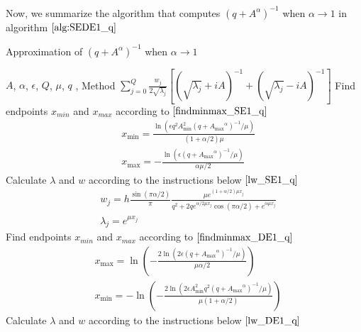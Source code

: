 Now, we summarize the algorithm that computes $(q+A^{\alpha})^{-1}$ when $\alpha \rightarrow 1$ in algorithm $\ref{alg:SEDE1_q}$
\begin{breakablealgorithm}
	\caption{Approximation of $(q+A^{\alpha})^{-1}$ when $\alpha \rightarrow 1$}
	\label{alg:SEDE1_q}
	\renewcommand{\algorithmicrequire}{\textbf{Input:}}
	\renewcommand{\algorithmicensure}{\textbf{Output:}}
	\begin{algorithmic}[1]
		\REQUIRE $A$, $\alpha$, $\epsilon$, $Q$,
		$\mu$, $q$ , Method %
		\ENSURE $\sum_{j=0}^{Q}\frac{w_j}{2\sqrt{\lambda_j}}\left[\left(\sqrt{\lambda_j}+iA\right)^{-1}+\left(\sqrt{\lambda_j}-iA\right)^{-1}\right]$    %
		\STATE  Find endpoints $x_{min}$ and $x_{max}$ according to $\eqref{findminmax_SE1_q}$\\
		\begin{equation*}
			\begin{aligned}
				&x_{\min}= \frac{\ln(\epsilon q^2 A^2_{\min} (q+{A_{\max}}^{\alpha})^{-1}/\mu)}{(1+\alpha/2)\mu}\\
				&x_{\max}=-\frac{\ln(\epsilon (q+{A_{\max}}^{\alpha})^{-1}/\mu)}{\alpha \mu/2}
			\end{aligned}
		\end{equation*}
		\STATE  Calculate $\lambda$ and $w$ according to the instructions below $\eqref{lw_SE1_q}$\\
		\begin{equation*}
			\begin{aligned}
				&w_j=h\frac{\sin(\pi \alpha/2)}{\pi}\frac{\mu e^{(1+\alpha/2)\mu x_j}}{q^2+2qe^{\alpha/2 \mu x_j}\cos(\pi\alpha/2)+e^{\alpha \mu x_j}}\\
				&\lambda_j=e^{\mu x_j}
			\end{aligned}
		\end{equation*}
		\ELSE[Method==DE]
		\STATE  Find endpoints $x_{min}$ and $x_{max}$ according to $\eqref{findminmax_DE1_q}$\\
		\begin{equation*}
			\begin{aligned}
				&x_{\max}=\ln\left(-\frac{2\ln(2\epsilon  (q+{A_{\max}}^{\alpha})^{-1}/\mu)}{\mu \alpha/2}\right)\\
				&x_{\min}=-\ln\left(-\frac{2\ln(2\epsilon A^2_{\min} q^2  (q+{A_{\max}}^{\alpha})^{-1}/\mu)}{\mu(1+\alpha/2)}\right)
			\end{aligned}
		\end{equation*}
		\STATE  Calculate $\lambda$ and $w$ according to the instructions below $\eqref{lw_DE1_q}$\\

\end{algorithmic}
\end{breakablealgorithm}
